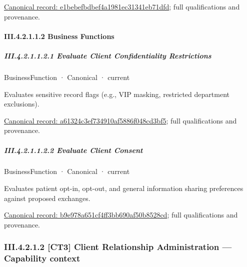 {\footnotesize \href{../../../../continuum/business/business-service/e1bebefbdbef4a1981ec31341eb71dfd.md}{Canonical record: e1bebefbdbef4a1981ec31341eb71dfd}; full qualifications and provenance.}\par
\paragraph*{III.4.2.1.1.2 Business Functions}
\label{navigation:III.4.2.1.1.2}

\subparagraph*{III.4.2.1.1.2.1 Evaluate Client Confidentiality Restrictions}
\label{navigation:III.4.2.1.1.2.1}

\label{element:a61324c3ef734910af5886f048cd3bf5}
{\small BusinessFunction · Canonical · current}\par

Evaluates sensitive record flags (e.g., VIP masking, restricted department exclusions).


{\footnotesize \href{../../../../continuum/business/business-function/a61324c3ef734910af5886f048cd3bf5.md}{Canonical record: a61324c3ef734910af5886f048cd3bf5}; full qualifications and provenance.}\par
\subparagraph*{III.4.2.1.1.2.2 Evaluate Client Consent}
\label{navigation:III.4.2.1.1.2.2}

\label{element:b9e978a651cf4ff3bb690af50b8528cd}
{\small BusinessFunction · Canonical · current}\par

Evaluates patient opt-in, opt-out, and general information sharing preferences against proposed exchanges.


{\footnotesize \href{../../../../continuum/business/business-function/b9e978a651cf4ff3bb690af50b8528cd.md}{Canonical record: b9e978a651cf4ff3bb690af50b8528cd}; full qualifications and provenance.}\par
\subsubsection*{III.4.2.1.2 [CT3] Client Relationship Administration — Capability context}
\label{navigation:III.4.2.1.2}

